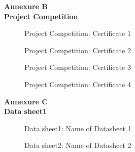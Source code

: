 \documentclass[12pt]{report}	%
\begin{document}
\clearpage
{} 
\begin{center}
    \textbf{Annexure B}\\
    \textbf{Project Competition}
\end{center}
\begin{figure}[h!]
\begin{centering}
 \caption{Project Competition: Certificate 1}
\end{centering}
\end{figure}

\begin{figure}[h!]
\begin{centering}
 \caption{Project Competition: Certificate 2}
\end{centering}
\end{figure}

\begin{figure}[h!]
\begin{centering}
 \caption{Project Competition: Certificate 3}
\end{centering}
\end{figure}

\begin{figure}[h!]
\begin{centering}
 \caption{Project Competition: Certificate 4}
\end{centering}
\end{figure}

\clearpage
{} 
\begin{center}
    \textbf{Annexure C}\\
    \textbf{Data sheet1}
\end{center}
\begin{figure}[h!]
\begin{centering}
 \caption{Data sheet1: Name of Datasheet 1}
\end{centering}
\end{figure}

\begin{figure}[h!]
\begin{centering}
 \caption{Data sheet2: Name of Datasheet 2}

\end{centering}
\end{figure}
\end{document}
